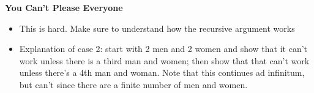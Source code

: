 \item \textbf{You Can't Please Everyone}
\begin{itemize}
\item This is hard. Make sure to understand how the recursive argument 
works 
\item Explanation of case 2: start with 2 men and 2 women and show that it 
can’t work unless there is a third man and women; then show that that 
can’t work unless there’s a 4th man and woman. Note that this continues 
ad infinitum, but can’t since there are a finite number of men and women.
\end{itemize}